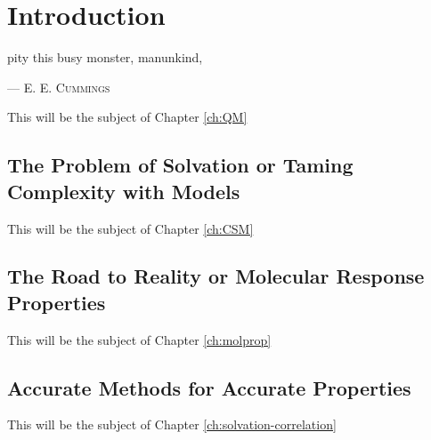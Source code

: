 \chapter*{Introduction}

\epigraph{
pity this busy monster, manunkind,
    }{
    --- \textsc{E. E. Cummings}}

This will be the subject of Chapter \ref{ch:QM}

\section*{The Problem of Solvation or Taming Complexity with Models}

\autocite{Anderson1972-ai}

This will be the subject of Chapter \ref{ch:CSM}

\section*{The Road to Reality or Molecular Response Properties}

This will be the subject of Chapter \ref{ch:molprop}

\section*{Accurate Methods for Accurate Properties}

This will be the subject of Chapter \ref{ch:solvation-correlation}
